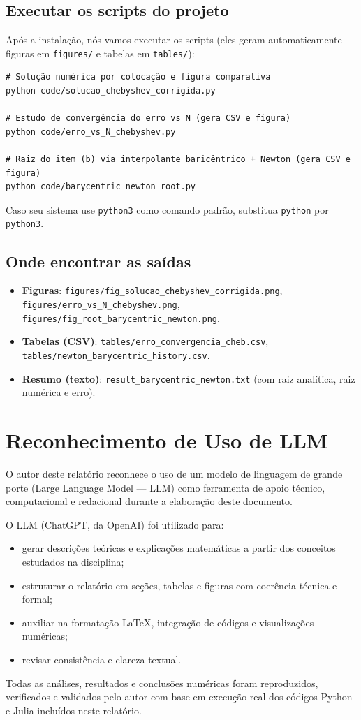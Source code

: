 \documentclass[11pt,a4paper]{article}
\begin{document}
\subsection{Executar os scripts do projeto}
Após a instalação, nós vamos executar os scripts (eles geram automaticamente figuras em \texttt{figures/} e tabelas em \texttt{tables/}):
\begin{verbatim}
# Solução numérica por colocação e figura comparativa
python code/solucao_chebyshev_corrigida.py

# Estudo de convergência do erro vs N (gera CSV e figura)
python code/erro_vs_N_chebyshev.py

# Raiz do item (b) via interpolante baricêntrico + Newton (gera CSV e figura)
python code/barycentric_newton_root.py
\end{verbatim}
Caso seu sistema use \verb|python3| como comando padrão, substitua \verb|python| por \verb|python3|.

\subsection{ Onde encontrar as saídas}
\begin{itemize}
  \item \textbf{Figuras}: \texttt{figures/fig\_solucao\_chebyshev\_corrigida.png}, \texttt{figures/erro\_vs\_N\_chebyshev.png}, \texttt{figures/fig\_root\_barycentric\_newton.png}.
  \item \textbf{Tabelas (CSV)}: \texttt{tables/erro\_convergencia\_cheb.csv}, \texttt{tables/newton\_barycentric\_history.csv}.
  \item \textbf{Resumo (texto)}: \texttt{result\_barycentric\_newton.txt} (com raiz analítica, raiz numérica e erro).
\end{itemize}

\section{Reconhecimento de Uso de LLM}

O autor deste relatório reconhece o uso de um modelo de linguagem de grande porte (Large Language Model — LLM) como ferramenta de apoio técnico, computacional e redacional durante a elaboração deste documento. 

O LLM (ChatGPT, da OpenAI) foi utilizado para:
\begin{itemize}
  \item gerar descrições teóricas e explicações matemáticas a partir dos conceitos estudados na disciplina;
  \item estruturar o relatório em seções, tabelas e figuras com coerência técnica e formal;
  \item auxiliar na formatação \LaTeX, integração de códigos e visualizações numéricas;
  \item revisar consistência e clareza textual.
\end{itemize}

Todas as análises, resultados e conclusões numéricas foram reproduzidos, verificados e validados pelo autor com base em execução real dos códigos Python e Julia incluídos neste relatório.
\end{document}
